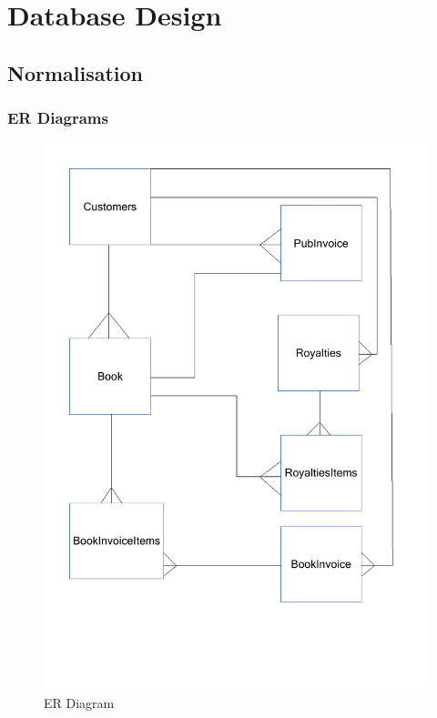 \newpage

\section{Database Design}

\subsection{Normalisation}
 
\subsubsection{ER Diagrams}


\begin{figure}[H]
    \caption{ER Diagram} \label{ER_Diagram.pdf}
    \includegraphics[width=\textwidth]{./Design/ER_Diagram.pdf}
\end{figure}



